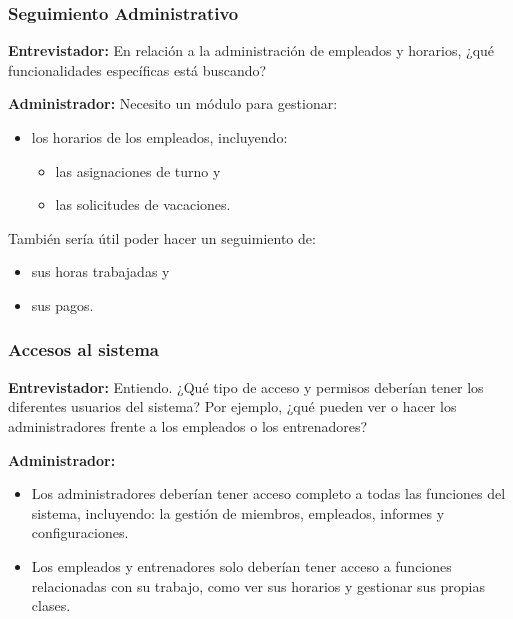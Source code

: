 \documentclass[spanish, 12pt]{article}
\providecommand{\tightlist}{\setlength{\itemsep}{0pt}
\setlength{\parskip}{0pt}}
\begin{document}
	\subsubsection{Seguimiento Administrativo}
	\label{seguimiento-administrativo}

	\textbf{Entrevistador:} En relación a la administración de empleados y
	horarios, ¿qué funcionalidades específicas está buscando?

	\textbf{Administrador:} Necesito un módulo para gestionar:

	\begin{itemize}
		\tightlist

		\item los horarios de los empleados, incluyendo:

			\begin{itemize}
				\tightlist

				\item las asignaciones de turno y

				\item las solicitudes de vacaciones.
			\end{itemize}
	\end{itemize}

	También sería útil poder hacer un seguimiento de:

	\begin{itemize}
		\tightlist

		\item sus horas trabajadas y

		\item sus pagos.
	\end{itemize}

	\subsubsection{Accesos al sistema}
	\label{accesos-al-sistema}

	\textbf{Entrevistador:} Entiendo. ¿Qué tipo de acceso y permisos deberían tener
	los diferentes usuarios del sistema? Por ejemplo, ¿qué pueden ver o hacer los administradores
	frente a los empleados o los entrenadores?

	\textbf{Administrador:}

	\begin{itemize}
		\tightlist

		\item Los administradores deberían tener acceso completo a todas las funciones
			del sistema, incluyendo: la gestión de miembros, empleados, informes y configuraciones.

		\item Los empleados y entrenadores solo deberían tener acceso a funciones relacionadas
			con su trabajo, como ver sus horarios y gestionar sus propias clases.
	\end{itemize}
\end{document}
